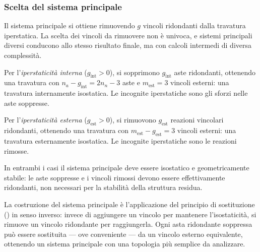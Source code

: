 \subsubsection{Scelta del sistema principale}
\label{subsec:sistema_principale}

Il sistema principale si ottiene rimuovendo $g$
vincoli ridondanti dalla travatura iperstatica.
La scelta dei vincoli da rimuovere non è univoca,
e sistemi principali diversi conducono allo stesso
risultato finale, ma con calcoli intermedi di
diversa complessità.

Per l'\emph{iperstaticità interna} ($g_\text{int} > 0$),
si sopprimono $g_\text{int}$ aste ridondanti,
ottenendo una travatura con $n_a - g_\text{int}
= 2n_n - 3$ aste e $m_\text{est} = 3$ vincoli
esterni: una travatura internamente isostatica.
Le incognite iperstatiche sono gli sforzi nelle
aste soppresse.

Per l'\emph{iperstaticità esterna} ($g_\text{est} > 0$),
si rimuovono $g_\text{est}$ reazioni vincolari
ridondanti, ottenendo una travatura con $m_\text{est}
- g_\text{est} = 3$ vincoli esterni: una travatura
esternamente isostatica. Le incognite iperstatiche
sono le reazioni rimosse.

In entrambi i casi il sistema principale deve essere
isostatico e geometricamente stabile: le aste
soppresse e i vincoli rimossi devono essere
effettivamente ridondanti, non necessari per
la stabilità della struttura residua.

\begin{oss}
	La costruzione del sistema principale è
	l'applicazione del principio di sostituzione
	() in senso
	inverso: invece di aggiungere un vincolo per
	mantenere l'isostaticità, si rimuove un vincolo
	ridondante per raggiungerla. Ogni asta ridondante
	soppressa può essere sostituita --- ove conveniente
	--- da un vincolo esterno equivalente, ottenendo
	un sistema principale con una topologia più
	semplice da analizzare.
\end{oss}


